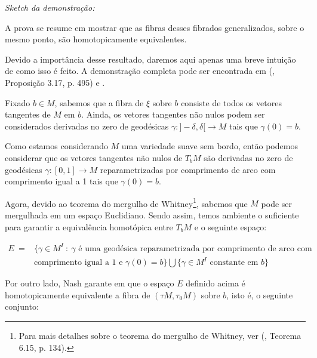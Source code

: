 \documentclass[12pt,oneside]{book} %
\begin{document}
\textit{Sketch da demonstração:}

\par A prova se resume em mostrar que as fibras desses fibrados generalizados, sobre o mesmo ponto, são homotopicamente equivalentes.

\par Devido a importância desse resultado, daremos aqui apenas uma breve intuição de como isso é feito. A demonstração completa pode ser encontrada em (\cite{fadell_1}, Proposição 3.17, p. 495) e \cite{nash}.

\par Fixado $b\in M$, sabemos que a fibra de $\xi$ sobre $b$ consiste de todos os vetores tangentes de $M$ em $b$. Ainda, os vetores tangentes não nulos podem ser considerados derivadas no zero de geodésicas $\gamma:]-\delta,\delta[\to M$ tais que $\gamma(0)=b$.

\par Como estamos considerando $M$ uma variedade suave sem bordo, então podemos considerar que os vetores tangentes não nulos de $T_{b}M$ são derivadas no zero de geodésicas $\gamma:[0,1]\to M$ reparametrizadas por comprimento de arco com comprimento igual a 1  tais que $\gamma(0)=b$.

\par Agora, devido ao teorema do mergulho de Whitney\footnote{Para mais detalhes sobre o teorema do mergulho de Whitney, ver (\cite{lee_s}, Teorema 6.15, p. 134).}, sabemos que $M$ pode ser mergulhada em um espaço Euclidiano. Sendo assim, temos ambiente o suficiente para garantir a equivalência homotópica entre $T_{b}M$ e o seguinte espaço: \newline

$\begin{array}{rl}
	E \ = & \{ \gamma\in M^{I} \ : \ \gamma \mbox{ é uma geodésica reparametrizada por comprimento de arco com} \\
	& \mbox{comprimento igual a 1 e } \gamma(0)=b \}\bigcup \{ \gamma\in M^{I} \mbox{ constante em } b \}
\end{array}$ \newline

\par Por outro lado, Nash garante em \cite{nash} que o espaço $E$ definido acima é homotopicamente equivalente a fibra de $(\tau M,\tau_{0}M)$ sobre $b$, isto é, o seguinte conjunto:
\end{document}
